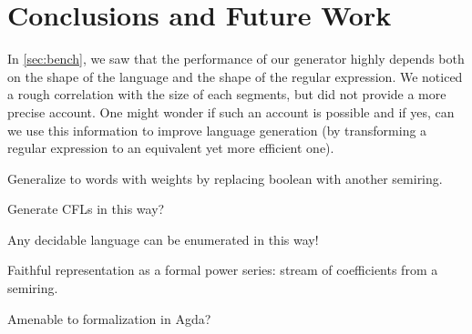 \section{Conclusions and Future Work}
\label{sec:conclusions}


In \cref{sec:bench}, we saw that the performance of our generator highly depends
both on the shape of the language and the shape of the regular expression.
We noticed a rough correlation with the size of each segments, but did not
provide a more precise account. One might wonder if such an account is possible
and if yes, can we use this information to improve language generation
(by transforming a regular expression to an equivalent yet more efficient one).


Generalize to words with weights by replacing boolean with another semiring.

Generate CFLs in this way?

Any decidable language can be enumerated in this way!

Faithful representation as a formal power series: stream of coefficients from a semiring.

Amenable to formalization in Agda?

